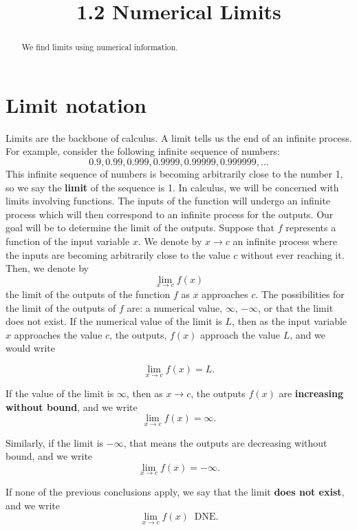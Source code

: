 \documentclass[handout]{ximera}
\title{1.2 Numerical Limits}
\begin{document}
\begin{abstract}
We find limits using numerical information.
\end{abstract}

\maketitle


\section{Limit notation}
 


Limits are the backbone of calculus. A limit tells us the end of an infinite process. For example, consider the following infinite sequence of numbers:
\[ 0.9, 0.99, 0.999, 0.9999, 0.99999, 0.999999, ... \]
This infinite sequence of numbers is becoming arbitrarily close to the number 1, so we say the \textbf{limit} of the sequence is 1.
In calculus, we will be concerned with limits involving functions.
The inputs of the function will undergo an infinite process which will then correspond to an infinite process for the outputs.  
Our goal will be to determine the limit of the outputs.
Suppose that $f$ represents a function of the input variable $x$.
We denote by $x \to c$ an infinite process where the inputs are becoming arbitrarily close to the value $c$ without ever reaching it.
Then, we denote by
\[ \lim_{x\to c} f(x) \]
the limit of the outputs of the function $f$ as $x$ approaches $c$.
The possibilities for the limit of the outputs of $f$ are: a numerical value, 
$\infty$, $-\infty$, or that the limit does not exist.
If the numerical value of the limit is $L$, then as the input variable $x$ approaches the value $c$, the outputs, $f(x)$ approach the value $L$, and we would write

\[ 
\lim_{x\to c} f(x) = L.
\]

If the value of the limit is $\infty$, then as $x \to c$, the outputs $f(x)$ are \textbf{increasing without bound},
and we write
\[
\lim_{x \to c} f(x) = \infty.
\]
  
Similarly, if the limit is $-\infty$, that means the outputs are decreasing without bound, and we write
\[
\lim_{x \to c} f(x) = -\infty.
\]


If none of the previous conclusions apply, we say that the limit \textbf{does not exist}, and we write
\[
\lim_{x \to c} f(x) \;\; \text{DNE}.
\] 
\end{document}
